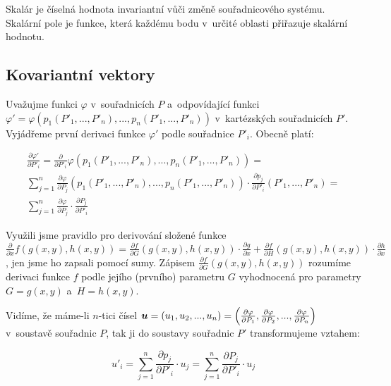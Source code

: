 \begin{fact}
Skalár je číselná hodnota invariantní vůči změně souřadnicového systému. Skalární pole je funkce, která každému bodu v~určité oblasti přiřazuje skalární hodnotu.
\end{fact}

\subsection{Kovariantní vektory}

Uvažujme funkci \(\varphi\) v~souřadnicích \(P\) a~odpovídající funkci \(\varphi' = \varphi(p_1(P'_1, ..., P'_n), ..., p_n(P'_1, ..., P'_n))\) v~kartézských souřadnicích \(P'\). Vyjádřeme první derivaci funkce \(\varphi'\) podle souřadnice \(P'_i\). Obecně platí:

\begin{equation}
\begin{split}
\frac{\partial \varphi'}{\partial P'_i} = \frac{\partial}{\partial P'_i} \varphi (p_1(P'_1, ..., P'_n), ..., p_n(P'_1, ..., P'_n)) = \\
\sum_{j=1}^n \frac{\partial \varphi}{\partial P_j} (p_1(P'_1, ..., P'_n), ..., p_n(P'_1, ..., P'_n)) \cdot \frac{\partial p_j}{\partial P'_i} (P'_1, ..., P'_n) = \\
\sum_{j=1}^n \frac{\partial \varphi}{\partial P_j} \cdot \frac{\partial P_j}{\partial P'_i}
\end{split}
\end{equation}

Využili jsme pravidlo pro derivování složené funkce \(\frac{\partial}{\partial x} f(g(x, y), h(x, y)) = \frac{\partial f}{\partial G}(g(x, y), h(x, y)) \cdot \frac{\partial g}{\partial x} + \frac{\partial f}{\partial H}(g(x, y), h(x, y)) \cdot \frac{\partial h}{\partial x}\), jen jsme ho zapsali pomocí sumy. Zápisem \(\frac{\partial f}{\partial G}(g(x, y), h(x, y))\) rozumíme derivaci funkce \(f\) podle jejího (prvního) parametru \(G\) vyhodnocená pro parametry \(G = g(x, y)\) a~\(H = h(x, y)\).

Vidíme, že máme-li \(n\)-tici čísel \(\boldsymbol{u} = (u_1, u_2, ..., u_n) = \left( \frac{\partial \varphi}{\partial P_1}, \frac{\partial \varphi}{\partial P_2}, ..., \frac{\partial \varphi}{\partial P_n} \right)\) v~soustavě souřadnic \(P\), tak ji do soustavy souřadnic \(P'\) transformujeme vztahem:

\begin{equation}
\label{eq:kovariantni_vektor}
u'_i = \sum_{j=1}^n \frac{\partial p_j}{\partial P'_i} \cdot u_j = \sum_{j=1}^n \frac{\partial P_j}{\partial P'_i} \cdot u_j
\end{equation}

